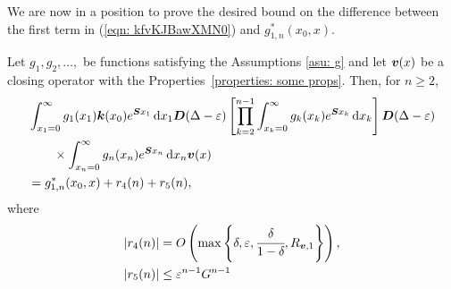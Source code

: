 We are now in a position to prove the desired bound on the difference between the first term in (\ref{eqn: kfvKJBawXMN0}) and \(g^*_{1,n}(x_0,x)\).
\begin{lem}\label{lem: lst convergence}
	Let \(g_1,g_2,\dots,\) be functions satisfying the Assumptions \ref{asu: g} and let \(\boldsymbol v(x)\) be a closing operator with the Properties~\ref{properties: some props}. Then, for \(n\geq 2\),  
	\begin{align}
		&\int_{x_1=0}^\infty g_1(x_1) \boldsymbol k(x_0) e^{\boldsymbol{S}x_1}\, \mathrm{d} x_1 \boldsymbol D(\Delta-\varepsilon)
            	\left[\prod_{k=2}^{n-1}\int_{x_k=0}^\infty g_k(x_k) e^{\boldsymbol{S}x_k} \, \mathrm{d} x_k \right]
		\boldsymbol D(\Delta-\varepsilon) \nonumber 
		\\&\qquad\times\int_{x_n=0}^\infty g_{n}(x_n) e^{\boldsymbol{S}x_n} \, \mathrm{d} x_n {\boldsymbol v}(x) \nonumber 
		\\& =g^{*}_{1,n}(x_0,x) + r_4(n) + r_5(n), \label{eqn: rhs g 2}
	\end{align}
	where  
	\begin{align*}
		|r_4(n)|&= O\left(\max\left\{\delta,\varepsilon,\cfrac{\delta}{1-\delta},R_{{\boldsymbol v},1}\right\}\right),
		\\|r_5(n)| &\leq \varepsilon^{n-1}G^{n-1}
	\end{align*}
\end{lem}
